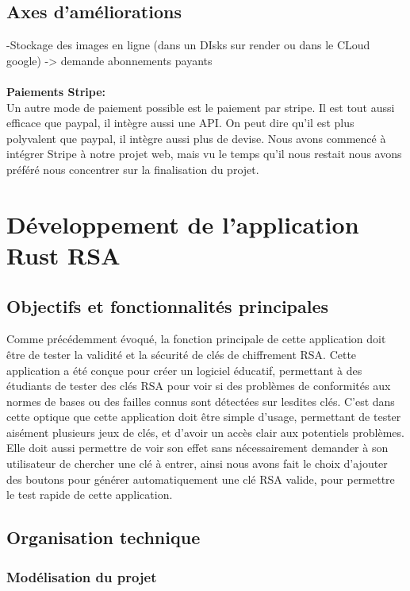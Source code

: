 \documentclass[12pt]{article} %
\begin{document}
	\subsection{Axes d'améliorations}
		-Stockage des images en ligne (dans un DIsks sur render ou dans le CLoud google) -> demande abonnements payants \\\\
        \textbf{Paiements Stripe:}\\
            Un autre mode de paiement possible est le paiement par stripe. Il est tout aussi efficace que paypal, il intègre aussi une API. On peut dire qu’il est plus polyvalent que paypal, il intègre aussi plus de devise.
            Nous avons commencé à intégrer Stripe à notre projet web, mais vu le temps qu’il nous restait nous avons préféré nous concentrer sur la finalisation du projet.

		

	
\newpage
\section{Développement de l'application Rust RSA}
	\subsection{Objectifs et fonctionnalités principales}
		Comme précédemment évoqué, la fonction principale de cette application doit être de tester la validité et la sécurité de clés de chiffrement RSA. Cette application a été conçue pour créer un logiciel éducatif, permettant à des étudiants de tester des clés RSA pour voir si des problèmes de conformités aux normes de bases ou des failles connus sont détectées sur lesdites clés.
	C’est dans cette optique que cette application doit être simple d’usage, permettant de tester aisément plusieurs jeux de clés, et d’avoir un accès clair aux potentiels problèmes. Elle doit aussi permettre de voir son effet sans nécessairement demander à son utilisateur de chercher une clé à entrer, ainsi nous avons fait le choix d’ajouter des boutons pour générer automatiquement une clé RSA valide, pour permettre le test rapide de cette application.


	\subsection{Organisation technique}
		\subsubsection{Modélisation du projet}
		
\end{document}
